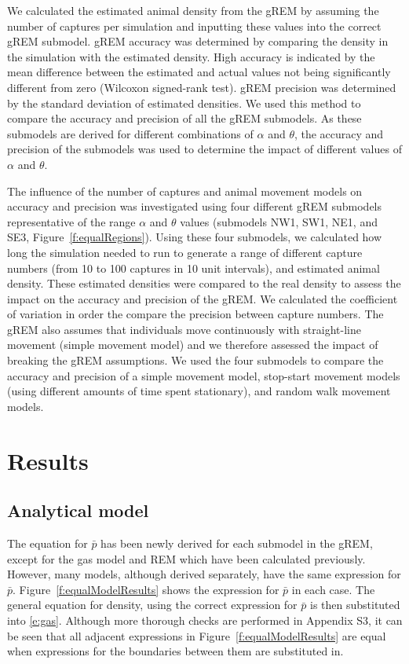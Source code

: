 \documentclass[a4paper,10pt,reqno,oneside]{amsart}
\begin{document}
We calculated the estimated animal density from the gREM by assuming the number of captures per simulation and inputting these values into the correct gREM submodel. gREM accuracy was determined by comparing the density in the simulation with the estimated density. High accuracy is indicated by the mean difference between the estimated and actual values not being significantly different from zero (Wilcoxon signed-rank test). gREM precision was determined by the standard deviation of estimated densities. We used this method to compare the accuracy and precision of all the gREM submodels. As these submodels are derived for different combinations of $\alpha$ and $\theta$, the accuracy and precision of the submodels was used to determine the impact of different values of $\alpha$ and $\theta$. 

The influence of the number of captures and animal movement models on accuracy and precision was investigated using four different gREM submodels representative of the range $\alpha$ and $\theta$ values (submodels NW1, SW1, NE1, and SE3, Figure~\ref{f:equalRegions}). Using these four submodels, we calculated how long the simulation needed to run to generate a range of different capture numbers (from 10 to 100 captures in 10 unit intervals), and estimated animal density. These estimated densities were compared to the real density to assess the impact on the accuracy and precision of the gREM. We calculated the coefficient of variation in order the compare the precision between capture numbers. The gREM also assumes that individuals move continuously with straight-line movement (simple movement model) and we therefore assessed the impact of breaking the gREM assumptions. We used the four submodels to compare the accuracy and precision of a simple movement model, stop-start movement models (using different amounts of time spent stationary), and random walk movement models.

\section*{Results}

\subsection*{Analytical model}

The equation for $\bar{p}$ has been newly derived for each submodel in the gREM, except for the gas model and REM which have been calculated previously. However, many models, although derived separately, have the same expression for $\bar{p}$. Figure~\ref{f:equalModelResults} shows the expression for $\bar{p}$ in each case. The general equation for density, using the correct expression for $\bar{p}$ is then substituted into \ref{e:gas}. Although more thorough checks are performed in Appendix S3, it can be seen that all adjacent expressions in Figure~\ref{f:equalModelResults} are equal when expressions for the boundaries between them are substituted in.
\end{document}
